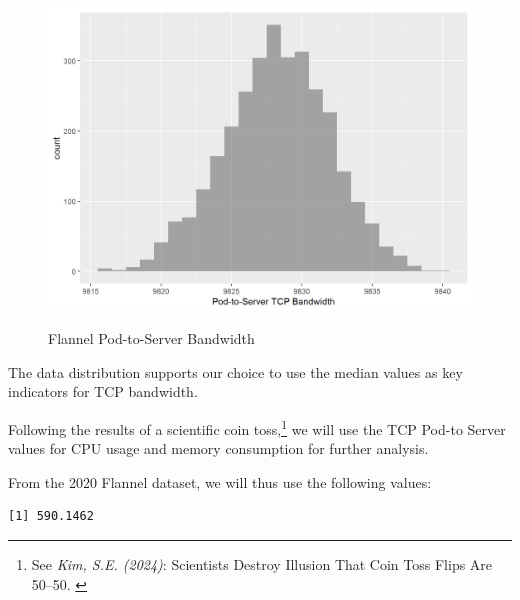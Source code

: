 \begin{figure}[H]
\centering
\caption {Flannel Pod-to-Server Bandwidth}
\includegraphics[width=\linewidth]{images/unnamed-chunk-9-1.png}
\label{fig:flannel-9-1}
\end{figure}

The data distribution supports our choice to use the median values as key indicators for TCP bandwidth.

Following the results of a scientific coin toss,\footnote{See \textit{Kim, S.E. (2024)}: Scientists Destroy Illusion That Coin Toss Flips Are 50–50. \cite{coinToss}} we will use the TCP Pod-to Server values for CPU usage and memory consumption for further analysis.

From the 2020 Flannel dataset, we will thus use the following values:

\begin{Shaded}
\begin{Highlighting}[]
\SpecialCharTok{\$}
\end{Highlighting}
\end{Shaded}

\begin{verbatim}
[1] 590.1462
\end{verbatim}

\begin{Shaded}
\begin{Highlighting}[]
\SpecialCharTok{\$}
\end{Highlighting}
\end{Shaded}

